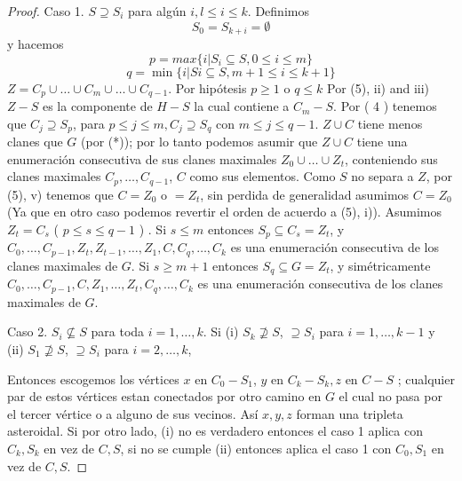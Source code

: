 \begin{proof}
    Caso 1. $S\supseteq S_i$ para alg\'un $i, l\leq i\leq k$. Definimos\\
    $$S_0=S_{k+i}=\emptyset$$ y hacemos
    $$p = max \{i | S_i \subseteq S, 0 \leq i \leq  m\}$$
    $$q = \min \{i | Si \subseteq S, m + 1\leq  i \leq  k + 1 \}$$
    $Z = C_p \cup \dots \cup C_m \cup \dots \cup C_{q-1}.$
    Por hip\'otesis $p\geq  1$  o $q \leq k$
    Por (5), ii) and iii) $Z - S$ es la componente de  $H - S$ la cual contiene a $C_m-S$.
    Por ( 4 ) tenemos que $ C_j\supseteq S_p$, para $p\leq j \leq m, C_j \supseteq S_q$ con $m\leq j\leq q-1$. $Z\cup C$ tiene menos clanes que $G$ (por (*)); por lo tanto podemos asumir que $Z \cup C$ tiene una enumeraci\'on consecutiva de sus clanes maximales $Z_0 \cup \dots  \cup Z_t$, conteniendo sus clanes maximales $C_p,\dots,  C_{q-1}$, $C$ como sus elementos. Como $S$ no separa a $Z$, por (5), v) tenemos que $C = Z_0$ o $=Z_t$, sin perdida de generalidad asumimos $C=Z_0$ (Ya que en otro caso 
    podemos revertir el orden de acuerdo a (5), i)). Asumimos $Z_t=C_s$ ( $p \leq s \leq q - 1$ ) . Si $s\leq m$ entonces $S_p \subseteq C_s = Z_t$, y $C_0,\dots, C_{p-1}, Z_t, Z_{t-1}, \dots ,Z_1, C, C_q ,\dots , C_k$ es una enumeraci\'on consecutiva de los clanes maximales de $G$. Si $s\geq m+1$ entonces $S_q\subseteq G =Z_t$, y sim\'etricamente $C_0,\dots, C_{p-1}, C, Z_1, \dots, Z_t, C_q, \dots , C_k$ es una enumeraci\'on consecutiva de los clanes maximales de $G$.
    
    Caso 2. $S_i \nsubseteq S$ para toda $i = 1,\dots , k$.
    Si
    (i) $S_k \nsupseteq S$, $\supseteq S_i$ para $i = 1, \dots , k - 1$
    y
    (ii) $S_1 \nsupseteq S$, $\supseteq S_i$ para $i = 2 , \dots ,k$,
    
    Entonces escogemos los v\'ertices  $x$ en $C_0-S_1$, $y$ en $C_k-S_k, z$ en $C - S$ ; cualquier par de estos v\'ertices estan conectados  por otro camino en $G$ el cual no pasa por el tercer v\'ertice o a alguno de sus vecinos.
    As\'i $x, y, z$ forman una tripleta asteroidal. Si por otro lado, (i) no es verdadero entonces el caso 1 aplica con $C_k, S_k$ en vez de $C, S$, si no se cumple (ii) entonces aplica el caso 1 con $C_0, S_1$ en vez de $C, S$.
    

    
    \end{proof}

